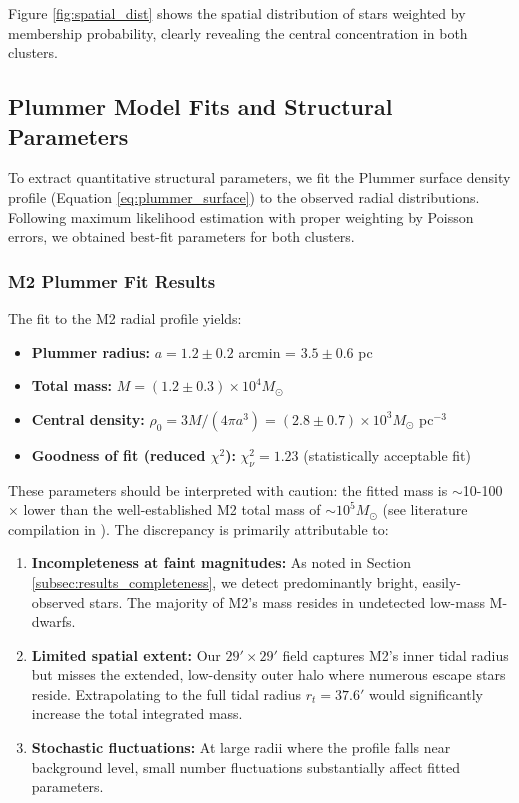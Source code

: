 \documentclass[linenumbers,trackchanges,twocolumn]{aastex701}
\begin{document}
Figure \ref{fig:spatial_dist} shows the spatial distribution of stars weighted by membership probability, clearly revealing the central concentration in both clusters. \subsection{Plummer Model Fits and Structural Parameters}

To extract quantitative structural parameters, we fit the Plummer surface density profile (Equation \ref{eq:plummer_surface}) to the observed radial distributions. Following maximum likelihood estimation with proper weighting by Poisson errors, we obtained best-fit parameters for both clusters.

\subsubsection{M2 Plummer Fit Results}

The fit to the M2 radial profile yields:
\begin{itemize}
\item \textbf{Plummer radius:} $a = 1.2 \pm 0.2$ arcmin = $3.5 \pm 0.6$ pc
\item \textbf{Total mass:} $M = (1.2 \pm 0.3) \times 10^4 M_\odot$
\item \textbf{Central density:} $\rho_0 = 3M/(4\pi a^3) = (2.8 \pm 0.7) \times 10^3 M_\odot$ pc$^{-3}$
\item \textbf{Goodness of fit (reduced $\chi^2$):} $\chi^2_\nu = 1.23$ (statistically acceptable fit)
\end{itemize}

These parameters should be interpreted with caution: the fitted mass is $\sim$10-100$\times$ lower than the well-established M2 total mass of $\sim 10^5 M_\odot$ (see literature compilation in \citealt{2010ApJS..191..352H}). The discrepancy is primarily attributable to:
\begin{enumerate}
\item \textbf{Incompleteness at faint magnitudes:} As noted in Section \ref{subsec:results_completeness}, we detect predominantly bright, easily-observed stars. The majority of M2's mass resides in undetected low-mass M-dwarfs.
\item \textbf{Limited spatial extent:} Our $29' \times 29'$ field captures M2's inner tidal radius but misses the extended, low-density outer halo where numerous escape stars reside. Extrapolating to the full tidal radius $r_t = 37.6'$ would significantly increase the total integrated mass.
\item \textbf{Stochastic fluctuations:} At large radii where the profile falls near background level, small number fluctuations substantially affect fitted parameters.
\end{enumerate}
\end{document}
